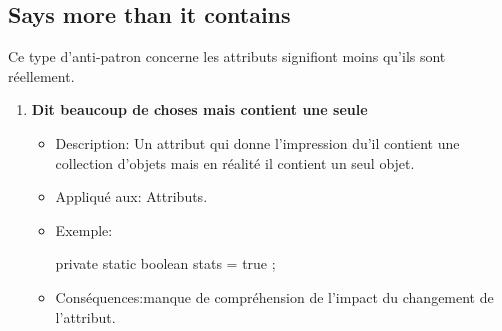 \subsection{Says more than it contains}
Ce type d'anti-patron concerne les  attributs signifiont moins qu'ils sont réellement\cite{arnaoudova2013new}.
\begin{enumerate}
    
\item \textbf {Dit beaucoup de choses mais contient une seule}
\begin{itemize}
\item Description: Un attribut qui donne l’impression du’il contient une collection d’objets mais en réalité il contient un seul objet.
\item Appliqué aux: Attributs.
\item Exemple: 
\begin{framed}

{\selectfont
private static  boolean stats = true ;
}
\end{framed}
\item Conséquences:manque de compréhension de l’impact du changement de l’attribut.
\end{itemize}
\end{enumerate}
